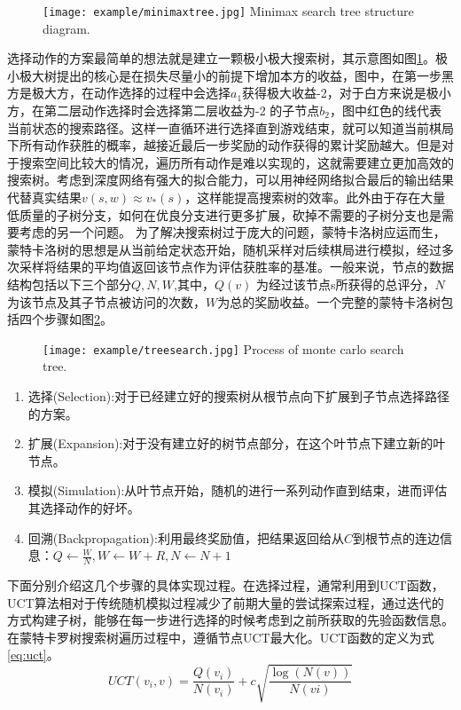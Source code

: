 \begin{figure}[htbp]
	\centering
	\texttt{[image: example/minimaxtree.jpg]}
	{Minimax search tree structure diagram.}
	\label{minimaxsearchtree}
\end{figure}
选择动作的方案最简单的想法就是建立一颗极小极大搜索树，其示意图如图\ref{minimaxsearchtree}。极小极大树提出的核心是在损失尽量小的前提下增加本方的收益，图中，在第一步黑方是极大方，在动作选择的过程中会选择$a_1$获得极大收益-2，对于白方来说是极小方，在第二层动作选择时会选择第二层收益为-2 的子节点$b_2$，图中红色的线代表当前状态的搜索路径。这样一直循环进行选择直到游戏结束，就可以知道当前棋局下所有动作获胜的概率，越接近最后一步奖励的动作获得的累计奖励越大。但是对于搜索空间比较大的情况，遍历所有动作是难以实现的，这就需要建立更加高效的搜索树。考虑到深度网络有强大的拟合能力，可以用神经网络拟合最后的输出结果代替真实结果$v(s,w) \approx {v_*}(s)$，这样能提高搜索树的效率。此外由于存在大量低质量的子树分支，如何在优良分支进行更多扩展，砍掉不需要的子树分支也是需要考虑的另一个问题。
为了解决搜索树过于庞大的问题，蒙特卡洛树应运而生，蒙特卡洛树的思想是从当前给定状态开始，随机采样对后续棋局进行模拟，经过多次采样将结果的平均值返回该节点作为评估获胜率的基准。一般来说，节点的数据结构包括以下三个部分${Q,N,W}$,其中，$Q(v)$ 为经过该节点s所获得的总评分，$N$为该节点及其子节点被访问的次数，$W$为总的奖励收益。一个完整的蒙特卡洛树包括四个步骤如图\ref{fig:treesearch}。

\begin{figure}[htbp]
	\centering
	\texttt{[image: example/treesearch.jpg]}
	{Process of monte carlo search tree.}
	\label{fig:treesearch}
\end{figure}

\begin{enumerate}
	\item 选择(Selection):对于已经建立好的搜索树从根节点向下扩展到子节点选择路径的方案。
	\item 扩展(Expansion):对于没有建立好的树节点部分，在这个叶节点下建立新的叶节点。
	\item 模拟(Simulation):从叶节点开始，随机的进行一系列动作直到结束，进而评估其选择动作的好坏。
	\item 回溯(Backpropagation):利用最终奖励值，把结果返回给从$C$到根节点的连边信息：$Q \leftarrow \frac{W}{N},W \leftarrow W + R,N \leftarrow N + 1$
\end{enumerate}

下面分别介绍这几个步骤的具体实现过程。在选择过程，通常利用到UCT函数，UCT算法相对于传统随机模拟过程减少了前期大量的尝试探索过程，通过迭代的方式构建子树，能够在每一步进行选择的时候考虑到之前所获取的先验函数信息。在蒙特卡罗树搜索树遍历过程中，遵循节点UCT最大化。UCT函数的定义为式\ref{eq:uct}。
\begin{equation}
\label{eq:uct}
UCT({v_i},v) = \frac{{Q({v_i})}}{{N({v_i})}} + c\sqrt {\frac{{\log (N(v))}}{{N(vi)}}} 
\end{equation}

